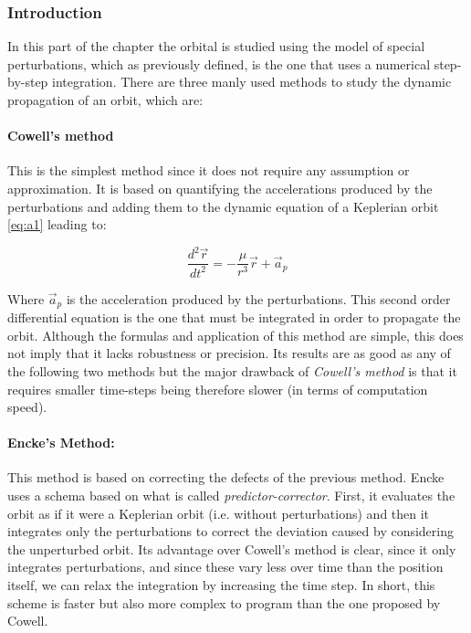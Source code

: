 \subsubsection{Introduction}
In this part of the chapter the orbital is studied using the model of special perturbations, which as previously defined, is the one that uses a numerical step-by-step integration. There are three manly used methods to study the dynamic propagation of an orbit, which are:\\

\paragraph{Cowell's method} This is the simplest method since it does not require any assumption or approximation. It is based on quantifying the accelerations produced by the perturbations and adding them to the dynamic equation of a Keplerian orbit \ref{eq:a1} leading to:

\begin{equation}\label{eq:ode}
\frac{d^2 \vec{r}}{d t^2}=-\frac{\mu}{r^3}\vec{r}+\vec{a}_p
\end{equation}

Where $\vec{a}_p$ is the acceleration produced by the perturbations. This second order differential equation is the one that must be integrated in order to propagate the orbit. Although the formulas and application of this method are simple, this does not imply that it lacks robustness or precision. Its results are as good as any of the following two methods but the major drawback of \textit{Cowell's method} is that it requires smaller time-steps being therefore slower (in terms of computation speed).\\

\paragraph{Encke's Method:} This method is based on correcting the defects of the previous method. Encke uses a schema based on what is called \textit{predictor-corrector}. First, it evaluates the orbit as if it were a Keplerian orbit (i.e. without perturbations) and then it integrates only the perturbations to correct the deviation caused by considering the unperturbed orbit. Its advantage over Cowell's method is clear, since it only integrates perturbations, and since these vary less over time than the position itself, we can relax the integration by increasing the time step. In short, this scheme is faster but also more complex to program than the one proposed by Cowell.\\

